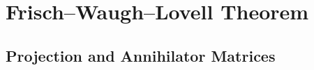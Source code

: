 \documentclass[xcolor=svgnames,9pt,english,aspectratio=169,t]{beamer}
\begin{document}
%
%

\section{Frisch–Waugh–Lovell Theorem}

\subsection{Projection and Annihilator Matrices}
\end{document}
